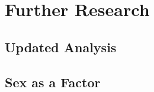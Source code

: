 \chapter{Further Research} \label{chap:Further research}

\section{Updated Analysis}



\section{Sex as a Factor}
